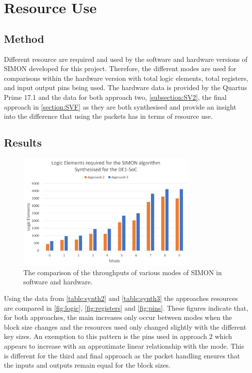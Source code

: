 \documentclass[12pt,twoside,a4paper]{report}
\begin{document}
	\section{Resource Use}
	\label{section:resource}
	
	\subsection{Method}
	
	Different resource are required and used by the software and hardware versions of SIMON developed for this project. Therefore, the different modes are used for comparisons within the hardware version with total logic elements, total registers, and input output pins being used. The hardware data is provided by the Quartus Prime 17.1 and the data for both approach two, \autoref{subsection:SV2}, the final approach in \autoref{section:SVF} as they are both synthesised and provide an insight into the difference that using the packets has in terms of resource use.
	
	\subsection{Results}
	
	\begin{figure}[H]
		\includegraphics[width=0.8\textwidth]{SIMON_logic}
		\centering
		\caption{The comparison of the throughputs of various modes of SIMON in software and hardware.}
		\label{fig:logic}
	\end{figure}
	
	Using the data from \autoref{table:synth2} and \autoref{table:synth3} the approaches resources are compared in \autoref{fig:logic}, \ref{fig:registers} and \ref{fig:pins}.  These figures indicate that, for both approaches, the main increases only occur between modes when the block size changes and the resources used only changed slightly with the different key sizes. An exemption to this pattern is the pins used in approach 2 which appears to increase with an approximate linear relationship with the mode. This is different for the third and final approach as the packet handling ensures that the inputs and outputs remain equal for the block sizes.
	
\end{document}
